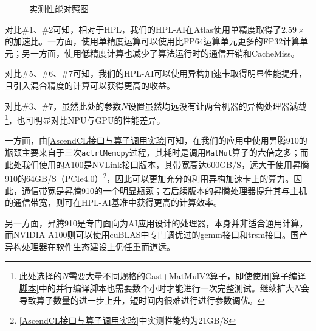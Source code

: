 \begin{figure}[h]
    \centering
    \caption{实测性能对照图}
    \label{实测性能对照图}
\end{figure}

对比\#1、\#2可知，相对于HPL，我们的HPL-AI在Atlas使用单精度取得了$2.59\times$的加速比。一方面，使用单精度运算可以使用比FP64运算单元更多的FP32计算单元；另一方面，使用低精度计算也减少了算法运行时的通信开销和CacheMiss。

对比\#5、\#6、\#7可知，我们的HPL-AI可以使用异构加速卡取得明显性能提升，且引入混合精度的计算可以获得更高的收益。

对比\#3、\#7，虽然此处的参数$N$设置虽然均远没有让两台机器的异构处理器满载\footnote{此处选择的$N$需要大量不同规格的Cast+MatMulV2算子，即使使用\autoref{算子编译脚本}中的并行编译脚本也需要数个小时才能进行一次完整测试。继续扩大$N$会导致算子数量的进一步上升，短时间内很难进行进行参数调优。}，也可明显对比NPU与GPU的性能差异。

一方面，由\autoref{AscendCL接口与算子调用实验}可知，在我们的应用中使用昇腾910的瓶颈主要来自于三次\lstinline{aclrtMemcpy}过程，其耗时是调用\lstinline{MatMul}算子的六倍之多；而此处我们使用的A100是NVLink接口版本，其带宽高达600GB/S，远大于使用昇腾910的64GB/S（PCIe4.0）\footnote{\autoref{AscendCL接口与算子调用实验}中实测性能约为21GB/S}，因此可以更加充分的利用异构加速卡上的算力。因此，通信带宽是昇腾910的一个明显瓶颈；若后续版本的昇腾处理器提升其与主机的通信带宽，则可在HPL-AI基准中获得更高的计算效率。

另一方面，昇腾910是专门面向为AI应用设计的处理器，本身并非适合通用计算，而NVIDIA A100则可以使用cuBLAS中专门调优过的gemm接口和trsm接口。国产异构处理器在软件生态建设上仍任重而道远。
